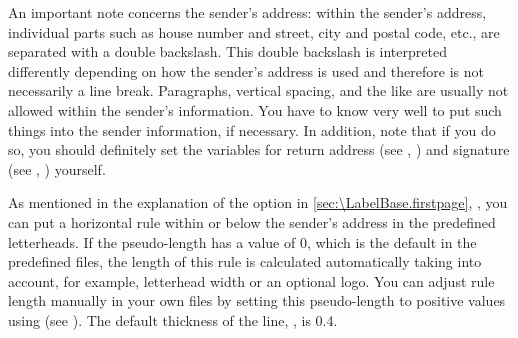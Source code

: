 An important note concerns the sender's address: within
the sender's address, individual parts such as house number and street, city
and postal code, etc., are separated with a double backslash. This double
backslash is interpreted differently depending on how the sender's address is
used and therefore is not necessarily a line break. Paragraphs, vertical
spacing, and the like are usually not allowed within the sender's information.
You have to know \KOMAScript{} very well to put such things into the sender
information, if necessary. In addition, note that if you do so, you should
definitely set the variables for return address (see
,
) and signature (see
,
) yourself.%
%
\EndIndexGroup


\begin{Declaration}
\end{Declaration}
As mentioned in the explanation of the
 option in
\autoref{sec:\LabelBase.firstpage}, , you
can put a horizontal rule within or below the sender's address in the
predefined letterheads. If the 
pseudo-length has a value of 0, which is the default in the
predefined  files, the length of this rule is calculated
automatically taking into account, for example, letterhead width or an
optional logo. You can adjust rule length manually in your own 
files by setting this pseudo-length to positive values using
 (see ). The
default thickness of the line,
, is 0.4.%
\EndIndexGroup


